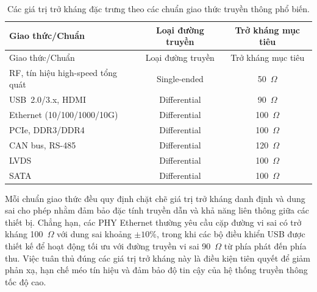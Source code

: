                         \begin{longtable}{|l|c|c|}
                            \caption{Các giá trị trở kháng đặc trưng theo các chuẩn giao thức truyền thông phổ biến.}
                            \label{tab:impedance_standards} \\
                            \hline
                            Giao thức/Chuẩn & Loại đường truyền & Trở kháng mục tiêu \\
                            \hline
                            \endfirsthead
                        
                            \hline
                            Giao thức/Chuẩn & Loại đường truyền & Trở kháng mục tiêu \\
                            \hline
                            \endhead
                        
                            \hline
                            \endfoot
                        
                            \hline
                            \endlastfoot
                        
                            RF, tín hiệu high-speed tổng quát & Single-ended & 50~\(\Omega\) \\
                            USB~2.0/3.x, HDMI & Differential & 90~\(\Omega\) \\
                            Ethernet (10/100/1000/10G) & Differential & 100~\(\Omega\) \\
                            PCIe, DDR3/DDR4 & Differential & 100~\(\Omega\) \\
                            CAN bus, RS-485 & Differential & 120~\(\Omega\) \\
                            LVDS & Differential & 100~\(\Omega\) \\
                            SATA & Differential & 100~\(\Omega\) \\
                        \end{longtable}
                        
                        Mỗi chuẩn giao thức đều quy định chặt chẽ giá trị trở kháng danh định và dung sai cho phép nhằm đảm bảo đặc tính truyền dẫn và khả năng liên thông giữa các thiết bị. Chẳng hạn, các PHY Ethernet thường yêu cầu cặp đường vi sai có trở kháng 100~\(\Omega\) với dung sai khoảng \(\pm 10\%\), trong khi các bộ điều khiển USB được thiết kế để hoạt động tối ưu với đường truyền vi sai 90~\(\Omega\) từ phía phát đến phía thu. Việc tuân thủ đúng các giá trị trở kháng này là điều kiện tiên quyết để giảm phản xạ, hạn chế méo tín hiệu và đảm bảo độ tin cậy của hệ thống truyền thông tốc độ cao.
                    
